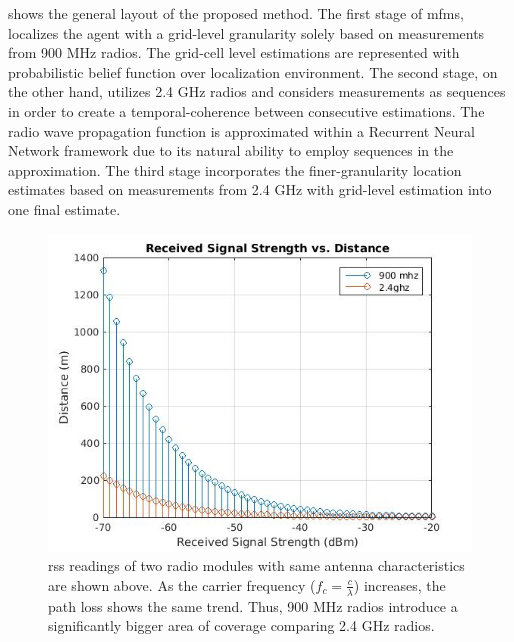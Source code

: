      shows the general layout of the proposed method.
    The first stage of \gls{mfms}, localizes the agent with a grid-level granularity solely based on measurements from 900 MHz radios.
    The grid-cell level estimations are represented with probabilistic belief function over localization environment.
    The second stage, on the other hand, utilizes 2.4 GHz radios and considers measurements as sequences in order to create a temporal-coherence between consecutive estimations.
    The radio wave propagation function is approximated within a Recurrent Neural Network framework due to its natural ability to employ sequences in the approximation.
    The third stage incorporates the finer-granularity location estimates based on measurements from 2.4 GHz with grid-level estimation into one final estimate.

    \begin{figure}[thpb]
        \centering
        \includegraphics[width=\linewidth]{figures/rss-vs-distance.jpg}
        \caption{\label{fig:log-distance}\gls{rss} readings of two radio modules with same antenna characteristics are shown above. As the carrier frequency ($f_c = \frac{c}{\lambda}$) increases, the path loss shows the same trend. Thus, 900 MHz radios introduce a significantly bigger area of coverage comparing 2.4 GHz radios.}
    \end{figure}

